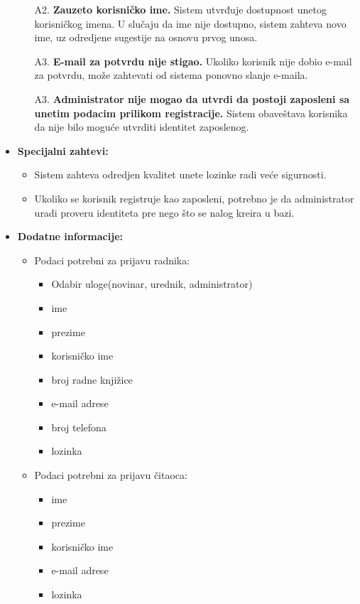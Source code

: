 \documentclass{article}
\begin{document}
\begin{itemize}
\begin{itemize}
            \item[A2.] \textbf{Zauzeto korisničko ime.} Sistem utvrđuje dostupnost unetog korisničkog imena. U slučaju da ime nije dostupno, sistem zahteva novo ime, uz odredjene sugestije na osnovu prvog unosa.
            \item[A3.] \textbf{E-mail za potvrdu nije stigao.} Ukoliko korisnik nije dobio e-mail za potvrdu, može zahtevati od sistema ponovno slanje e-maila.
             \item[A3.] \textbf{Administrator nije mogao da utvrdi da postoji zaposleni sa unetim podacim prilikom registracije.}
             Sistem obaveštava korisnika da nije bilo moguće utvrditi identitet zaposlenog.
        \end{itemize}
    \item \textbf{Specijalni zahtevi:}
        \begin{itemize}
			\item Sistem zahteva odredjen kvalitet unete lozinke radi veće sigurnosti.
			\item Ukoliko se korisnik registruje kao zaposleni, potrebno je da administrator uradi proveru identiteta pre nego što se nalog kreira u bazi.
		\end{itemize}
	\item \textbf{Dodatne informacije:}
        \begin{itemize}
            \item  Podaci potrebni za prijavu radnika:
                \begin{itemize}
                    \item Odabir uloge(novinar, urednik, administrator)
                    \item ime
                    \item prezime
                    \item korisničko ime
                    \item broj radne knjižice
                    \item e-mail adrese
                    \item broj telefona
                    \item lozinka
                \end{itemize}
             \item  Podaci potrebni za prijavu čitaoca:
                \begin{itemize}
                    \item ime
                    \item prezime
                    \item korisničko ime
                    \item e-mail adrese
                    \item lozinka
                \end{itemize}
        \end{itemize}
\end{itemize}
\end{document}
